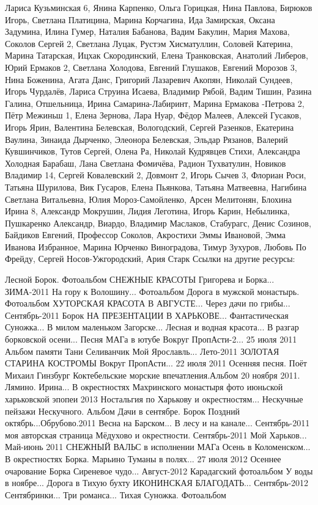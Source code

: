Лариса Кузьминская 6, Янина Карпенко, Ольга Горицкая, Нина Павлова, Бирюков Игорь, Светлана Платицина, Марина Корчагина, Ида Замирская, Оксана Задумина, Илина Гумер, Наталия Бабанова, Вадим Бакулин, Мария Махова, Соколов Сергей 2, Светлана Луцак, Рустэм Хисматуллин, Соловей Катерина, Марина Татарская, Ицхак Скородинский, Елена Транковская, Анатолий Либеров, Юрий Ермаков 2, Светлана Холодова, Евгений Глушаков, Евгений Морозов 3, Нина Боженина, Агата Данс, Григорий Лазаревич Акопян, Николай Сундеев, Игорь Чурдалёв, Лариса Струина Исаева, Владимир Рябой, Вадим Тишин, Разина Галина, Отшельница, Ирина Самарина-Лабиринт, Марина Ермакова -Петрова 2, Пётр Межиньш 1, Елена Зернова, Лара Нуар, Фёдор Малеев, Алексей Гусаков, Игорь Ярин, Валентина Белевская, Вологодский, Сергей Разенков, Екатерина Ваулина, Зинаида Дырченко, Элеонора Белевская, Эльдар Рязанов, Валерий Кувшинчиков, Тутов Сергей, Олена Ра, Николай Кудрявцев Стихи, Александра Холодная Барабаш, Лана Светлана Фомичёва, Радион Тухватулин, Новиков Владимир 14, Сергей Ковалевский 2, Довмонт 2, Игорь Сычев 3, Флориан Роси, Татьяна Шурилова, Вик Гусаров, Елена Пьянкова, Татьяна Матвеевна, Нагибина Светлана Витальевна, Юлия Мороз-Самойленко, Арсен Мелитонян, Блохина Ирина 8, Александр Мокрушин, Лидия Леготина, Игорь Карин, Небылинка, Пушкаренко Александр, Виардо, Владимир Маслаков, Стабурагс, Денис Созинов, Байдиков Евгений, Профессор Соколов, Акростихи Эммы Ивановой, Эмма Иванова Избранное, Марина Юрченко Виноградова, Тимур Зухуров, Любовь По Фрейду, Сергей Носов-Ужгородский, Ария Старк
Ссылки на другие ресурсы:

    Лесной Борок. Фотоальбом
    СНЕЖНЫЕ КРАСОТЫ Григорева и Борка... ЗИМА-2011
    На гору к Волошину... Фотоальбом
    Дорога в мужской монастырь. Фотоальбом
    ХУТОРСКАЯ КРАСОТА В АВГУСТЕ...
    Через дачи по грибы... Сентябрь-2011 Борок
    НА ПРЕЗЕНТАЦИИ В ХАРЬКОВЕ...
    Фантастическая Суножка...
    В милом маленьком Загорске...
    Лесная и водная красота...
    В разгар борковской осени...
    Песня МАГа в ютубе
    Вокруг ПропАсти-2... 25 июля 2011
    Альбом памяти Тани Селиванчик
    Мой Ярославль... Лето-2011
    ЗОЛОТАЯ СТАРИНА КОСТРОМЫ
    Вокруг ПропАсти... 22 июля 2011
    Осенняя песня. Поёт Михаил Гинзбург
    Коктебельские морские впечатления.Альбом
    20 ноября 2011. Лямино. Ирина...
    В окрестностях Махринского монастыря
    фото июньской харьковской эпопеи 2013
    Ностальгия по Харькову и окрестностям...
    Нескучные пейзажи Нескучного. Альбом
    Дачи в сентябре. Борок
    Поздний октябрь...Обрубово.2011
    Весна на Барском...
    В лесу и на канале... Сентябрь-2011
    моя авторская страница
    Мёдухово и окрестности. Сентябрь-2011
    Мой Харьков... Май-июнь 2011
    СНЕЖНЫЙ ВАЛЬС в исполнении МАГа
    Осень в Коломенском...
    В окрестностях Борка. Марьино
    Туманы в полях... 27 июля 2012
    Осеннее очарование Борка
    Сиреневое чудо... Август-2012
    Карадагский фотоальбом
    У воды в ноябре...
    Дорога в Тихую бухту
    ИКОНИНСКАЯ БЛАГОДАТЬ... Сентябрь-2012
    Сентябринки... Три романса...
    Тихая Суножка. Фотоальбом

